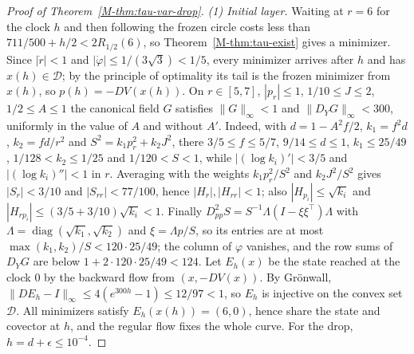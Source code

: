 \documentclass[aip,jmp,amsmath,amssymb,reprint]{revtex4-2}
\theoremstyle{plain}
\theoremstyle{definition}
\begin{document}
\begin{proof}[Proof of Theorem~\ref{M-thm:tau-var-drop}]
\emph{(1) Initial layer.} Waiting at $r=6$ for the clock $h$ and then following the frozen circle costs
less than $711/500+h/2<2R_{1/2}(6)$, so Theorem~\ref{M-thm:tau-exist} gives a minimizer. Since $|\dot r|<1$ and
$|\dot\varphi|\le1/(3\sqrt3)<1/5$, every minimizer arrives after $h$ and has $x(h)\in\mathcal D$; by the principle of
optimality its tail is the frozen minimizer from $x(h)$, so $p(h)=-DV(x(h))$. On
$r\in[5,7]$, $|p_r|\le1$, $1/10\le J\le2$, $1/2\le A\le1$ the canonical field $G$ satisfies $\|G\|_\infty<1$ and
$\|D_YG\|_\infty<300$, uniformly in the value of $A$ and without $A'$. Indeed, with $d=1-A^2f/2$, $k_1=f^2d$,
$k_2=fd/r^2$ and $S^2=k_1p_r^2+k_2J^2$, there $3/5\le f\le5/7$, $9/14\le d\le1$, $k_1\le25/49$, $1/128<k_2\le1/25$ and
$1/120<S<1$, while $|(\log k_i)'|<3/5$ and $|(\log k_i)''|<1$ in $r$. Averaging with the weights $k_1p_r^2/S^2$ and
$k_2J^2/S^2$ gives $|S_r|<3/10$ and $|S_{rr}|<77/100$, hence $|H_r|,|H_{rr}|<1$; also $|H_{p_i}|\le\sqrt{k_i}$ and
$|H_{rp_i}|\le(3/5+3/10)\sqrt{k_i}<1$. Finally
$D^2_{pp}S=S^{-1}\Lambda(I-\xi\xi^\top)\Lambda$ with $\Lambda=\operatorname{diag}(\sqrt{k_1},\sqrt{k_2})$ and
$\xi=\Lambda p/S$, so its entries are at most $\max(k_1,k_2)/S<120\cdot25/49$; the column of $\varphi$ vanishes, and
the row sums of $D_YG$ are below $1+2\cdot120\cdot25/49<124$. Let $E_h(x)$ be the state reached at
the clock $0$ by the backward flow from $(x,-DV(x))$. By Gr\"onwall,
$\|DE_h-I\|_\infty\le4(e^{300h}-1)\le12/97<1$, so $E_h$ is injective on the convex set $\mathcal D$. All minimizers
satisfy $E_h(x(h))=(6,0)$, hence share the state and covector at $h$, and the regular flow fixes the
whole curve. For the drop, $h=d+\epsilon\le10^{-4}$.


\end{proof}
\end{document}
